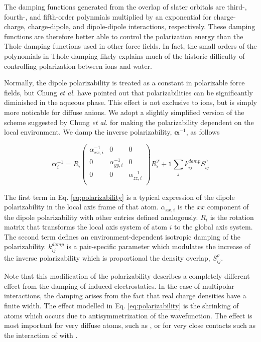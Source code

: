 \documentclass[journal=jctcce,manuscript=article]{achemso}
\begin{document}
The damping functions generated from the overlap of slater orbitals are
third-, fourth-, and fifth-order polynmials multiplied by an exponential for charge-charge, charge-dipole,
and dipole-dipole interactions, respectively. These damping functions are therefore better able
to control the polarization energy than the Thole damping functions used in other force fields.
In fact, the small orders of the polynomials in Thole damping likely explains much of the historic difficulty of controlling
polarization between ions and water.\cite{jiao2006simulation,mason2012accurate}

Normally, the dipole polarizability is treated as a constant in polarizable force fields,
but Chung \textit{et al.} have pointed out that polarizabilities
can be significantly diminished in the aqueous phase.\cite{chung2022classical}
This effect is not exclusive to ions, but is simply more noticable for diffuse anions. We adopt a slightly
simplified version of the scheme suggested by Chung \textit{et al.} for making the polarizability dependent on the local
environment. We damp the inverse polarizability, $\bm{\alpha}^{-1}$, as follows

\begin{equation}
  \bm{\alpha}^{-1}_i=
  R_i\begin{pmatrix}
    \alpha^{-1}_{xx,i} & 0 & 0 \\
    0 & \alpha^{-1}_{yy,i} & 0 \\
    0 & 0 & \alpha^{-1}_{zz,i} \\
  \end{pmatrix}R_i^T
    +\mathds{1}\sum_{j}k^{damp}_{ij}S_{ij}^\rho
    \label{eq:polarizability}
\end{equation}
\noindent

The first term in Eq. \ref{eq:polarizability} is a typical expression of the dipole polarizability
in the local axis frame of that atom. $\alpha_{xx,i}$ is the $xx$ component of the dipole polarizability
with other entries defined analogously. $R_i$ is the rotation matrix that transforms the local
axis system of atom $i$ to the global axis system. The second term defines an environment-dependent
isotropic damping of the polarizability.
$k_{ij}^{damp}$ is a pair-specific parameter which modulates the increase of the inverse polarizability
which is proportional the density overlap, $S_{ij}^\rho$.

Note that this modification of the polarizability describes a completely different
effect from the damping of induced electrostatics. In the case of multipolar interactions,
the damping arises from the fact that real charge densities have a finite width. The effect
modelled in Eq. \ref{eq:polarizability} is the shrinking of atoms which occurs due to
antisymmetrization of the wavefunction. The effect is most important for very diffuse atoms, such as ,
or for very close contacts such as the interaction of  with .
\end{document}
